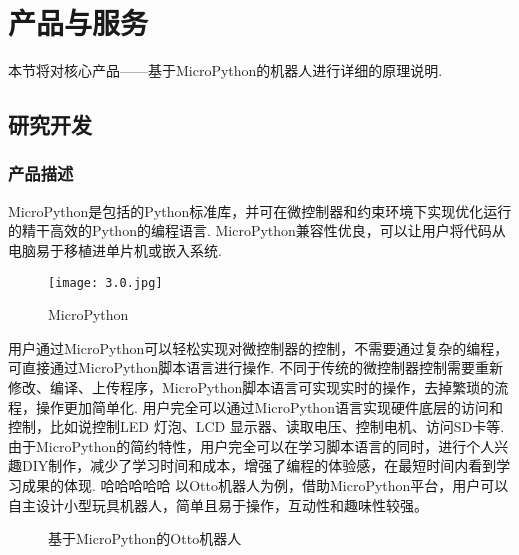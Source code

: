 ﻿\section{产品与服务}
本节将对核心产品——基于MicroPython的机器人进行详细的原理说明.
\subsection{研究开发}
\subsubsection{产品描述}
MicroPython是包括的Python标准库，并可在微控制器和约束环境下实现优化运行的精干高效的Python的编程语言.
MicroPython兼容性优良，可以让用户将代码从电脑易于移植进单片机或嵌入系统.

\begin{figure}[H]
\centering
\texttt{[image: 3.0.jpg]}
\caption{MicroPython}
\label{MicroPython}
\end{figure}

用户通过MicroPython可以轻松实现对微控制器的控制，不需要通过复杂的编程，可直接通过MicroPython脚本语言进行操作.
不同于传统的微控制器控制需要重新修改、编译、上传程序，MicroPython脚本语言可实现实时的操作，去掉繁琐的流程，操作更加简单化.
用户完全可以通过MicroPython语言实现硬件底层的访问和控制，比如说控制LED 灯泡、LCD 显示器、读取电压、控制电机、访问SD卡等.
由于MicroPython的简约特性，用户完全可以在学习脚本语言的同时，进行个人兴趣DIY制作，减少了学习时间和成本，增强了编程的体验感，在最短时间内看到学习成果的体现.
哈哈哈哈哈
以Otto机器人为例，借助MicroPython平台，用户可以自主设计小型玩具机器人，简单且易于操作，互动性和趣味性较强。

\begin{figure}[H]
\centering
{}%
%
\caption{基于MicroPython的Otto机器人}
\label{基于MicroPython的Otto机器人}
\end{figure}

